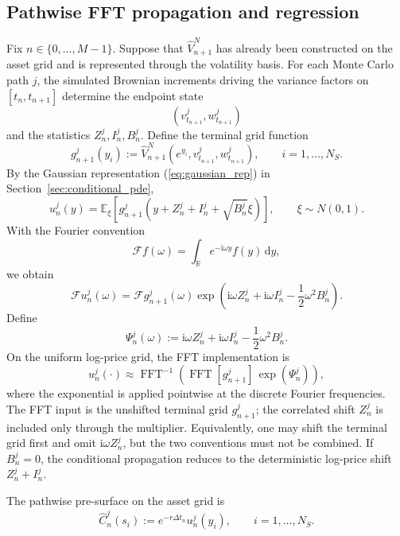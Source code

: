 \documentclass[pdflatex,sn-mathphys-num]{sn-jnl}
\theoremstyle{thmstyleone}%
\theoremstyle{thmstylethree}%
\theoremstyle{thmstyletwo}%
\newcommand{\dd}{\mathrm d}
\newcommand{\E}{\mathbb E}
\newcommand{\R}{\mathbb R}
\begin{document}
\subsection{Pathwise FFT propagation and regression}
Fix $n\in\{0,\ldots,M-1\}$. Suppose that $\widehat V_{n+1}^N$ has already been
constructed on the asset grid and is represented through the volatility basis.
For each Monte Carlo path $j$, the simulated Brownian increments driving the
variance factors on $[t_n,t_{n+1}]$ determine the endpoint state
$$
(v_{t_{n+1}}^j,w_{t_{n+1}}^j)
$$
and the statistics $Z_n^j,I_n^j,B_n^j$. Define the terminal grid function
$$
g_{n+1}^j(y_i)
:=
\widehat V_{n+1}^N
\left(e^{y_i},v_{t_{n+1}}^j,w_{t_{n+1}}^j\right),
\qquad i=1,\ldots,N_S.
$$
By the Gaussian representation (\ref{eq:gaussian_rep}) in Section~\ref{sec:conditional_pde},
$$
u_n^j(y)
=
\E_\xi\!\left[
g_{n+1}^j
\left(
y+Z_n^j+I_n^j+\sqrt{B_n^j}\xi
\right)
\right],
\qquad \xi\sim N(0,1).
$$
With the Fourier convention
$$
\mathcal F f(\omega)
=
\int_{\R}e^{-\mathrm i\omega y}f(y)\,\dd y,
$$
we obtain
$$
\mathcal F u_n^j(\omega)
=
\mathcal F g_{n+1}^j(\omega)
\exp\left(
\mathrm i\omega Z_n^j+\mathrm i\omega I_n^j-\frac12\omega^2B_n^j
\right).
$$
Define
$$
\Psi_n^j(\omega)
:=
\mathrm i\omega Z_n^j+\mathrm i\omega I_n^j-\frac12\omega^2B_n^j.
$$
On the uniform log-price grid, the FFT implementation is
\begin{equation}
u_n^j(\cdot)
\approx
\operatorname{FFT}^{-1}
\left(
\operatorname{FFT}[g_{n+1}^j]\,
\exp(\Psi_n^j)
\right),
\label{eq:fft-recursion}
\end{equation}
where the exponential is applied pointwise at the discrete Fourier frequencies.
The FFT input is the unshifted terminal grid $g_{n+1}^j$; the correlated shift
$Z_n^j$ is included only through the multiplier. Equivalently, one may shift the
terminal grid first and omit $\mathrm i\omega Z_n^j$, but the two conventions
must not be combined. If $B_n^j=0$, the conditional propagation reduces to the
deterministic log-price shift $Z_n^j+I_n^j$.

The pathwise pre-surface on the asset grid is
$$
\widehat C_n^j(s_i)
:=
e^{-r\Delta t_n}u_n^j(y_i),
\qquad i=1,\ldots,N_S.
$$
\end{document}
